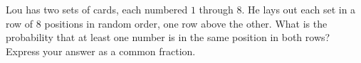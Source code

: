Lou has two sets of cards, each numbered $1$ through $8$. He lays out each set in a row of $8$ positions in random order, one row above the other. What is the probability that at least one number is in the same position in both rows? Express your answer as a common fraction.
